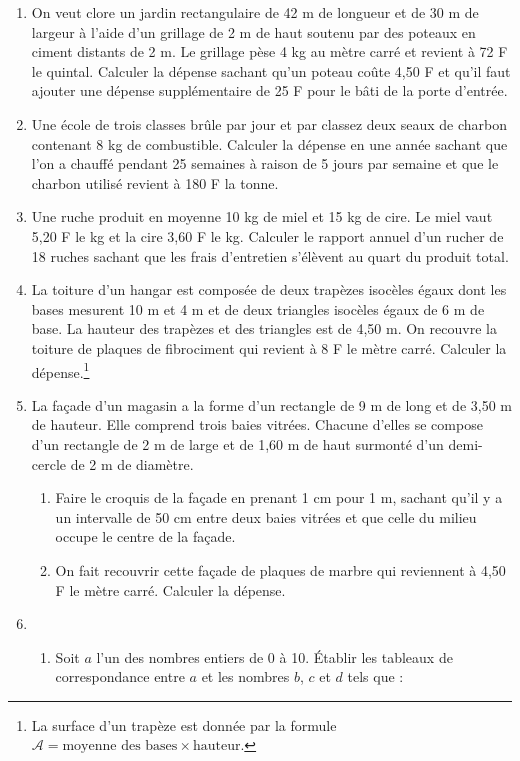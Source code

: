 \documentclass[12 pt]{extarticle}
\theoremstyle{plain}
\begin{document}
\begin{enumerate}
 \item On veut clore un jardin rectangulaire de 42 m de longueur et de 30 m de largeur à l'aide d'un grillage de 2 m de haut soutenu par des poteaux en 
 ciment distants de 2 m. Le grillage pèse 4 kg au mètre carré et revient à 72 F le quintal. Calculer la dépense sachant qu'un poteau coûte 4,50 F et qu'il faut ajouter une dépense supplémentaire de 25 F pour 
 le bâti de la porte d'entrée.
 \item Une école de trois classes brûle par jour et par classez deux seaux de charbon contenant 8 kg de 
 combustible. Calculer la dépense en une année sachant
 que l'on a chauffé pendant 25 semaines à raison de 
 5 jours par semaine et que le charbon utilisé revient à 180 F la tonne. 
 \item Une ruche produit en moyenne 10 kg de miel et 15 kg de cire. Le miel vaut 5,20 F le kg et la cire 3,60 F le kg. Calculer le rapport annuel d'un rucher 
 de 18 ruches sachant que les frais d'entretien s'élèvent au quart du produit total. 
 \item La toiture d'un hangar est composée de deux 
 trapèzes isocèles égaux dont les bases mesurent 
 10 m et 4 m et de deux triangles isocèles égaux de 6 m de base. La hauteur des trapèzes et des triangles est de 4,50 m. On recouvre la toiture de plaques de 
 fibrociment qui revient à 8 F le mètre carré. Calculer la dépense.\footnote{La surface d'un trapèze est donnée par la formule $\mathcal A = \text{moyenne des bases}\times \text{hauteur}$.}
 \item La façade d'un magasin a la forme d'un rectangle de 9 m de long et de 3,50 m de hauteur. Elle
 comprend trois baies vitrées. Chacune d'elles se compose d'un rectangle de 2 m de large et de 1,60 m de haut surmonté d'un demi-cercle de 2 m de diamètre. 
 \begin{enumerate}
 \item Faire le croquis de la façade en prenant 1 cm 
 pour 1 m, sachant qu'il y a un intervalle de 50 cm
 entre deux baies vitrées et que celle du milieu occupe le centre de la façade. 
 \item On fait recouvrir cette façade de plaques de marbre qui reviennent à 4,50 F le mètre carré. Calculer la dépense. 
 \end{enumerate}
\item \begin{enumerate}
\item Soit $a$ l'un des nombres entiers de 0 à 10. 
Établir les tableaux de correspondance entre $a$ et 
les nombres $b$, $c$ et $d$ tels que : 

\end{enumerate}
\end{enumerate}
\end{document}
